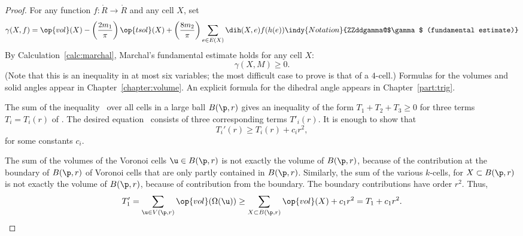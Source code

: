 \begin{proof}
For any function $f:\ring{R}\to\ring{R}$ and any cell $X$, set
\begin{equation}\label{eqn:gamma-def}
\gamma(X,f) =  \op{vol}(X)
-\left(\frac{2m_1}{\pi}\right) \op{tsol}(X) + \left(\frac{8m_2}{\pi}\right)
\sum_{e\in E(X)} \dih(X,e)  f(h(e))
\indy{Notation}{ZZddgamma@$\gamma$ (fundamental estimate)}%
\end{equation}
By Calculation~\ref{calc:marchal}, Marchal's fundamental estimate
holds for any cell
$X$: %
\begin{equation}\label{eqn:mfe}
\gamma(X,M)\ge 0.
\end{equation}
(Note that this is an inequality in at most six variables; the most
difficult case to prove is that of a $4$-cell.)  Formulas for the
volumes and solid angles appear in Chapter~\ref{chapter:volume}.  An
explicit formula for the dihedral angle appears in
Chapter~\ref{part:trig}.

The sum of the inequality~ over all cells in a large ball
$B(\p,r)$ gives an inequality of the form $T_1 + T_2 + T_3\ge 0$ for
three terms $T_i = T_i(r)$ of .  The desired
equation~ consists of three corresponding terms
$T'_i(r)$.  It is enough to show that
\begin{displaymath}
T_i'(r) \ge T_i(r) + c_i r^2,
\end{displaymath}
for some constants $c_i$.

The sum of the volumes of the Voronoi cells $ \u\in B(\p,r)$ is not
exactly the volume of $B(\p,r)$, because of the contribution at the
boundary of $B(\p,r)$ of Voronoi cells that are only partly contained
in $B(\p,r)$.  Similarly, the sum of the various $k$-cells, for
$X\subset B(\p,r)$ is not exactly the volume of $B(\p,r)$, because of
contribution from the boundary. The boundary contributions have order
$r^2$. Thus,
\begin{displaymath}
T_1'= \sum_{ \u\in  V(\p,r)} \op{vol}(\Omega( \u)) \ge \sum_{X\subset B(\p,r)} \op{vol}(X) + c_1 r^2 = T_1 + c_1 r^2.
\end{displaymath}



\end{proof}
